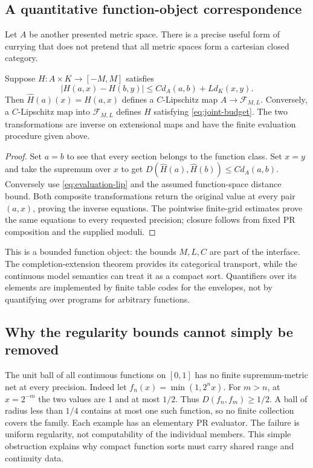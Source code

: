\subsection{A quantitative function-object correspondence}

Let \(A\) be another presented metric space. There is a precise useful form of currying that does not pretend that all metric spaces form a cartesian closed category.

\begin{proposition}\label{prop:currying}
Suppose \(H:A\times K\to[-M,M]\) satisfies
\begin{equation}
 |H(a,x)-H(b,y)|\leq C d_A(a,b)+L d_K(x,y).
 \label{eq:joint-budget}
\end{equation}
Then \(\widehat H(a)(x)=H(a,x)\) defines a \(C\)-Lipschitz map \(A\to\mathcal F_{M,L}\). Conversely, a \(C\)-Lipschitz map into \(\mathcal F_{M,L}\) defines \(H\) satisfying \eqref{eq:joint-budget}. The two transformations are inverse on extensional maps and have the finite evaluation procedure given above.
\end{proposition}

\begin{proof}
Set \(a=b\) to see that every section belongs to the function class. Set \(x=y\) and take the supremum over \(x\) to get
\(D(\widehat H(a),\widehat H(b))\leq C d_A(a,b)\). Conversely use \eqref{eq:evaluation-lip} and the assumed function-space distance bound. Both composite transformations return the original value at every pair \((a,x)\), proving the inverse equations. The pointwise finite-grid estimates prove the same equations to every requested precision; closure follows from fixed PR composition and the supplied moduli.
\end{proof}

This is a bounded function object: the bounds \(M,L,C\) are part of the interface. The completion-extension theorem provides its categorical transport, while the continuous model semantics can treat it as a compact sort. Quantifiers over its elements are implemented by finite table codes for the envelopes, not by quantifying over programs for arbitrary functions.

\subsection{Why the regularity bounds cannot simply be removed}

The unit ball of all continuous functions on \([0,1]\) has no finite supremum-metric net at every precision. Indeed let
\(f_n(x)=\min(1,2^n x)\). For \(m>n\), at \(x=2^{-m}\) the two values are \(1\) and at most \(1/2\). Thus \(D(f_n,f_m)\geq1/2\). A ball of radius less than \(1/4\) contains at most one such function, so no finite collection covers the family. Each example has an elementary PR evaluator. The failure is uniform regularity, not computability of the individual members. This simple obstruction explains why compact function sorts must carry shared range and continuity data.
